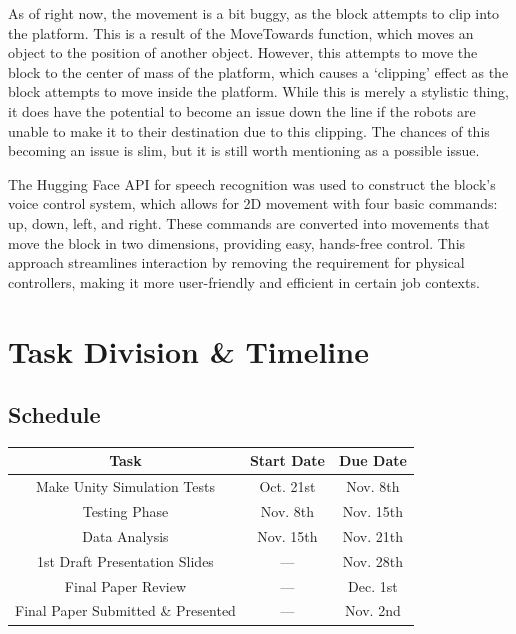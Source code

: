 \documentclass[conference]{IEEEtran}
\begin{document}
As of right now, the movement is a bit buggy, as the block attempts to clip into the platform. This is a result of the MoveTowards function, which moves an object to the position of another object. However, this attempts to move the block to the center of mass of the platform, which causes a ‘clipping’ effect as the block attempts to move inside the platform. While this is merely a stylistic thing, it does have the potential to become an issue down the line if the robots are unable to make it to their destination due to this clipping. The chances of this becoming an issue is slim, but it is still worth mentioning as a possible issue.

The Hugging Face API for speech recognition was used to construct the block's voice control system, which allows for 2D movement with four basic commands: up, down, left, and right. These commands are converted into movements that move the block in two dimensions, providing easy, hands-free control. This approach streamlines interaction by removing the requirement for physical controllers, making it more user-friendly and efficient in certain job contexts. 
\section{Task Division \& Timeline}
\subsection{Schedule}
\begin{table}[htbp]
\begin{center}
\begin{tabular}{|c|c|c|}
\hline
\textbf{Task} & \textbf{Start Date} & \textbf{Due Date} \\
\hline
Make Unity Simulation Tests & Oct. 21st & Nov. 8th \\
\hline
Testing Phase & Nov. 8th & Nov. 15th \\
\hline
Data Analysis & Nov. 15th & Nov. 21th \\
\hline
1st Draft Presentation Slides & --- & Nov. 28th \\
\hline
Final Paper Review & --- & Dec. 1st \\
\hline
Final Paper Submitted \& Presented & --- & Nov. 2nd \\
\hline
\end{tabular}
\label{tab1}
\end{center}
\end{table}
\end{document}
